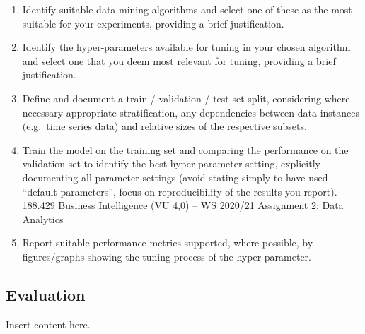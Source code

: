 \documentclass[sigchi]{acmart}
\def\tightlist{}
\begin{document}
\begin{enumerate}
\def\labelenumi{\alph{enumi}.}
\tightlist
\item
  Identify suitable data mining algorithms and select one of these as the most suitable for your experiments, providing a brief justification.
\item
  Identify the hyper-parameters available for tuning in your chosen algorithm and select one that you deem most relevant for tuning, providing a brief justification.
\item
  Define and document a train / validation / test set split, considering where necessary appropriate stratification, any dependencies between data instances (e.g.~time series data) and relative sizes of the respective subsets.
\item
  Train the model on the training set and comparing the performance on the validation set to identify the best hyper-parameter setting, explicitly documenting all parameter settings (avoid stating simply to have used ``default parameters'', focus on reproducibility of the results you report).
  188.429 Business Intelligence (VU 4,0) -- WS 2020/21 Assignment 2: Data Analytics
\item
  Report suitable performance metrics supported, where possible, by figures/graphs showing the tuning process of the hyper parameter.
\end{enumerate}

\hypertarget{evaluation}{%
\subsection{Evaluation}\label{evaluation}}

Insert content here.
\end{document}
